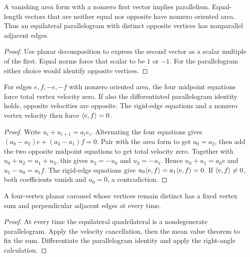 \begin{lemma}
\label{lem:square-nondegenerate}
\leanok
{}
A vanishing area form with a nonzero first vector implies parallelism.
Equal-length vectors that are neither equal nor opposite have nonzero
oriented area. Thus an equilateral parallelogram with distinct opposite
vertices has nonparallel adjacent edges.
\end{lemma}
\begin{proof}
\leanok
Use planar decomposition to express the second vector as a scalar
multiple of the first. Equal norms force that scalar to be $1$ or $-1$.
For the parallelogram either choice would identify opposite vertices.
\end{proof}

\begin{lemma}
\label{lem:square-velocity}
\leanok
{}
For edges $e,f,-e,-f$ with nonzero oriented area, the four midpoint
equations force total vertex velocity zero. If also the differentiated
parallelogram identity holds, opposite velocities are opposite. The
rigid-edge equations and a nonzero vertex velocity then force $\langle e,f\rangle=0$.
\end{lemma}
\begin{proof}
\leanok
Write $u_i+u_{i+1}=a_i e_i$. Alternating the four equations gives
$(a_0-a_2)e+(a_3-a_1)f=0$. Pair with the area form to get $a_0=a_2$,
then add the two opposite midpoint equations to get total velocity zero.
Together with $u_0+u_2=u_1+u_3$, this gives
$u_2=-u_0$ and $u_3=-u_1$. Hence
$u_0+u_1=a_0e$ and $u_1-u_0=a_1f$.
The rigid-edge equations give $a_0\langle e,f\rangle=a_1\langle e,f\rangle=0$.
If $\langle e,f\rangle\neq0$, both coefficients vanish and $u_0=0$, a contradiction.
\end{proof}

\begin{proposition}
\label{prop:square-motion}
\leanok
{}
A four-vertex planar carousel whose vertices remain distinct has a fixed
vertex sum and perpendicular adjacent edges at every time.
\end{proposition}
\begin{proof}
\leanok
At every time the equilateral quadrilateral is a nondegenerate parallelogram.
Apply the velocity cancellation, then the mean value theorem to fix the sum.
Differentiate the parallelogram identity and apply the right-angle calculation.
\end{proof}

